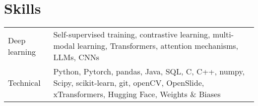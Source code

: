 \documentclass[a4paper,12pt]{article}
\begin{document}
\section{Skills}
\begin{tabularx}{\linewidth}{@{}l X@{}}
Deep learning & \normalsize{Self-supervised training, contrastive learning, multi-modal learning, Transformers, attention mechanisms, LLMs, CNNs}\\
Technical &  \normalsize{Python, Pytorch, pandas, Java, SQL, C, C++,  numpy, Scipy, scikit-learn, git, openCV, OpenSlide, xTransformers, Hugging Face, Weights \& Biases} 
\end{tabularx}

\vfill
{}
\end{document}
